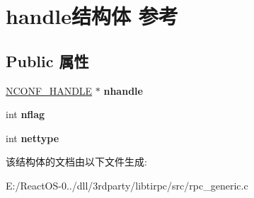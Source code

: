 \hypertarget{structhandle}{}\section{handle结构体 参考}
\label{structhandle}
\subsection*{Public 属性}
\begin{DoxyCompactItemize}
\item 
\mbox{\label{structhandle_a88d4b872eba432548b0832926664704e}} 
\hyperlink{struct_n_c_o_n_f___h_a_n_d_l_e}{N\+C\+O\+N\+F\+\_\+\+H\+A\+N\+D\+LE} $\ast$ {\bfseries nhandle}
\item 
\mbox{\label{structhandle_af5784c8fc06a78c8deb5e5b7fa8ca8bf}} 
int {\bfseries nflag}
\item 
\mbox{\label{structhandle_acbe38f62157be6e4685e70b3800c8979}} 
int {\bfseries nettype}
\end{DoxyCompactItemize}


该结构体的文档由以下文件生成\+:\begin{DoxyCompactItemize}
\item 
E\+:/\+React\+O\+S-\/0../dll/3rdparty/libtirpc/src/rpc\+\_\+generic.\+c\end{DoxyCompactItemize}
